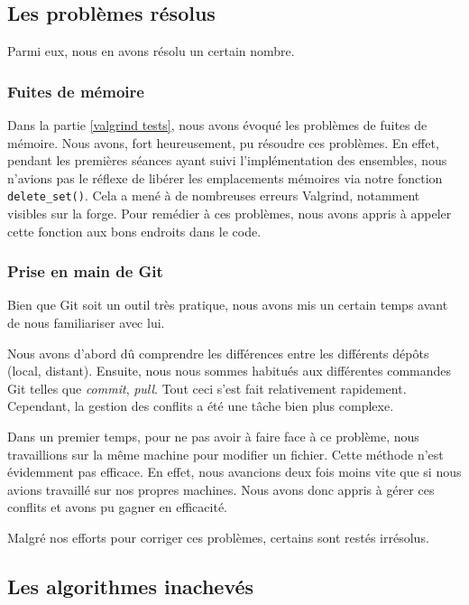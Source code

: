 \documentclass[a4paper]{article}
\begin{document}
\subsection{Les problèmes résolus}
\label{pb resolus}

Parmi eux, nous en avons résolu un certain nombre.

\subsubsection{Fuites de mémoire}
\label{fuite mem}

Dans la partie \ref{valgrind tests}, nous avons évoqué les problèmes de fuites de mémoire. Nous avons, fort heureusement, pu résoudre ces problèmes. En effet, pendant les premières séances ayant suivi l'implémentation des ensembles, nous n'avions pas le réflexe de libérer les emplacements mémoires via notre fonction \verb|delete_set()|. Cela a mené à de nombreuses erreurs Valgrind, notamment visibles sur la forge. Pour remédier à ces problèmes, nous avons appris à appeler cette fonction aux bons endroits dans le code. 

\subsubsection{Prise en main de Git}
\label{pb git}

Bien que Git soit un outil très pratique, nous avons mis un certain temps avant de nous familiariser avec lui.

Nous avons d'abord dû comprendre les différences entre les différents dépôts (local, distant). Ensuite, nous nous sommes habitués aux différentes commandes Git telles que \emph{commit}, \emph{pull}. Tout ceci s'est fait relativement rapidement. Cependant, la gestion des conflits a été une tâche bien plus complexe.

Dans un premier temps, pour ne pas avoir à faire face à ce problème, nous travaillions sur la même machine pour modifier un fichier. Cette méthode n'est évidemment pas efficace. En effet, nous avancions deux fois moins vite que si nous avions travaillé sur nos propres machines. Nous avons donc appris à gérer ces conflits et avons pu gagner en efficacité.

\vspace{0.5cm}

Malgré nos efforts pour corriger ces problèmes, certains sont restés irrésolus.

\subsection{Les algorithmes inachevés}
\label{algos inachevés}
\end{document}
